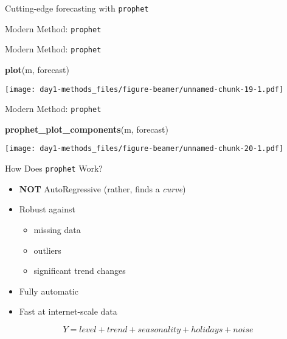 \documentclass[ignorenonframetext,]{beamer}
\newenvironment{Shaded}{\begin{snugshade}}{\end{snugshade}}
\newcommand{\KeywordTok}[1]{\textcolor[rgb]{0.13,0.29,0.53}{\textbf{#1}}}
\newcommand{\NormalTok}[1]{#1}
\providecommand{\tightlist}{%
  \setlength{\itemsep}{0pt}\setlength{\parskip}{0pt}}
\begin{document}
\begin{frame}[fragile]{Cutting-edge forecasting with \texttt{prophet}}
\begin{block}{Modern Method: \texttt{prophet}}
\end{block}

\begin{block}{Modern Method: \texttt{prophet}}

\begin{Shaded}
\begin{Highlighting}[]
\KeywordTok{plot}\NormalTok{(m, forecast)}
\end{Highlighting}
\end{Shaded}

\texttt{[image: day1-methods\_files/figure-beamer/unnamed-chunk-19-1.pdf]}

\end{block}

\begin{block}{Modern Method: \texttt{prophet}}

\begin{Shaded}
\begin{Highlighting}[]
\KeywordTok{prophet_plot_components}\NormalTok{(m, forecast)}
\end{Highlighting}
\end{Shaded}

\texttt{[image: day1-methods\_files/figure-beamer/unnamed-chunk-20-1.pdf]}

\end{block}

\begin{block}{How Does \texttt{prophet} Work?}

\begin{itemize}
\tightlist
\item
  \textbf{NOT} AutoRegressive (rather, finds a \emph{curve})
\item
  Robust against

  \begin{itemize}
  \tightlist
  \item
    missing data
  \item
    outliers
  \item
    significant trend changes
  \end{itemize}
\item
  Fully automatic
\item
  Fast at internet-scale data
\end{itemize}

\[Y = level + trend + seasonality + holidays + noise\]

\end{block}

\end{frame}
\end{document}
